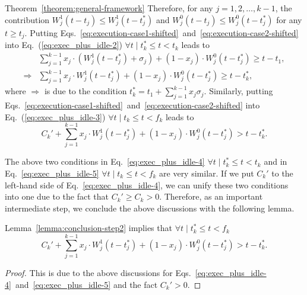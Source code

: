 \begin{appProof}{Theorem~\ref{theorem:general-framework}}
Therefore, for any $j=1,2,\ldots,k-1$, the contribution $W_j^1(t-t_j)
\leq W_j^1(t-t_j^*)$ and $W_j^0(t-t_j) \leq W_j^0(t-t_j^*)$ for any $t
\geq t_j$. Putting Eqs.~\eqref{eq:execution-case1-shifted}~and~\eqref{eq:execution-case2-shifted} into 
Eq.~(\ref{eq:exec_plus_idle-2}) $\forall t \mid t_k^* \leq t < t_k$ leads to
{\small \begin{align}
&\sum_{j=1}^{k-1} x_j\cdot (W_j^1(t-t_j^*)+\sigma_j) + (1-x_j)\cdot W_j^0(t-t_j^*) \geq t-t_1,\nonumber\\
\Rightarrow& \sum_{j=1}^{k-1} x_j\cdot W_j^1(t-t_j^*) + (1-x_j)\cdot W_j^0(t-t_j^*) \geq t-t_k^*,
\label{eq:exec_plus_idle-4}
\end{align}}where $\Rightarrow$ is due to the condition
$t_k^* = t_1 + \sum_{j=1}^{k-1}x_j\sigma_j$.
Similarly, putting Eqs.~\eqref{eq:execution-case1-shifted}~and~\eqref{eq:execution-case2-shifted} into 
Eq.~(\ref{eq:exec_plus_idle-3}) $\forall t \mid t_k \leq t < f_k$ leads to 
\begin{equation}
\label{eq:exec_plus_idle-5}
C_k'+\sum_{j=1}^{k-1} x_j\cdot W_j^1(t-t_j^*) + (1-x_j)\cdot W_j^0(t-t_j^*) > t-t_k^*.
\end{equation}

The above two conditions in Eq.~\eqref{eq:exec_plus_idle-4} $\forall t \mid t_k^* \leq t < t_k$ and in Eq.~\eqref{eq:exec_plus_idle-5} $\forall t \mid t_k \leq t < f_k$ are very similar. If we put $C_k'$ to the left-hand side of Eq.~\eqref{eq:exec_plus_idle-4}, we can unify these two conditions into one due to the fact that $C_k' \geq C_k > 0$. Therefore, as an important intermediate step, we conclude the above discussions with the following lemma.

\begin{Lemma}
\label{lemma:step-3-one-condition}
Lemma~\ref{lemma:conclusion-step2} implies that
$\forall t \mid t_k^* \leq t < f_k$
\begin{equation}
\label{eq:exec_plus_idle-almost-final} 
C_k'+\sum_{j=1}^{k-1} x_j\cdot W_j^1(t-t_j^*) + (1-x_j)\cdot W_j^0(t-t_j^*) > t-t_k^*.
\end{equation}  
\end{Lemma}
\begin{proof}
  This is due to the above discussions for Eqs.~\eqref{eq:exec_plus_idle-4}~and~\eqref{eq:exec_plus_idle-5} and the fact $C_k' > 0$.
\end{proof}


\end{appProof}
